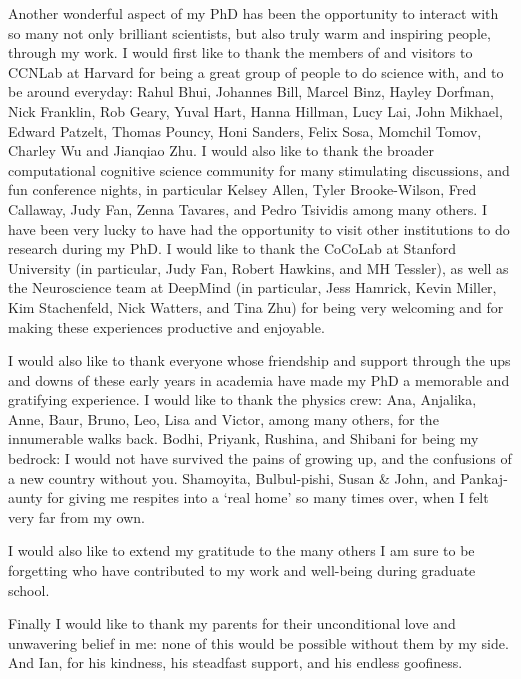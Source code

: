 Another wonderful aspect of my PhD has been the opportunity to interact with so many not only brilliant scientists, but also truly warm and inspiring people, through my work. I would first like to thank the members of and visitors to CCNLab at Harvard for being a great group of people to do science with, and to be around everyday: Rahul Bhui, Johannes Bill, Marcel Binz, Hayley Dorfman, Nick Franklin, Rob Geary, Yuval Hart, Hanna Hillman, Lucy Lai, John Mikhael, Edward Patzelt, Thomas Pouncy, Honi Sanders, Felix Sosa,  Momchil Tomov, Charley Wu and Jianqiao Zhu. I would also like to thank the broader computational cognitive science community for many stimulating discussions, and fun conference nights, in particular Kelsey Allen, Tyler Brooke-Wilson, Fred Callaway, Judy Fan,  Zenna Tavares, and Pedro Tsividis among many others. I have been very lucky to have had the opportunity to visit other institutions to do research during my PhD. I would like to thank the CoCoLab at Stanford University (in particular, Judy Fan, Robert Hawkins, and MH Tessler), as well as the Neuroscience team at DeepMind (in particular, Jess Hamrick, Kevin Miller, Kim Stachenfeld, Nick Watters, and Tina Zhu) for being very welcoming and for making these experiences productive and enjoyable.

I would also like to thank everyone whose friendship and support through the ups and downs of these early years in academia have made my PhD a memorable and gratifying experience. I would like to thank the physics crew: Ana, Anjalika, Anne, Baur, Bruno, Leo, Lisa and Victor, among many others, for the innumerable walks back. Bodhi, Priyank, Rushina, and Shibani for being my bedrock: I would not have survived the pains of growing up, and the confusions of a new country without you. Shamoyita, Bulbul-pishi, Susan \& John, and Pankaj-aunty for giving me respites into a `real home' so many times over, when I felt very far from my own.

I would also like to extend my gratitude to the many others I am sure to be forgetting who have contributed to my work and well-being during graduate school.


Finally I would like to thank my parents for their unconditional love and unwavering belief in me: none of this would be possible without them by my side. And Ian, for his kindness, his steadfast support, and his endless goofiness.

%
%
%
%
%
%
%
%



